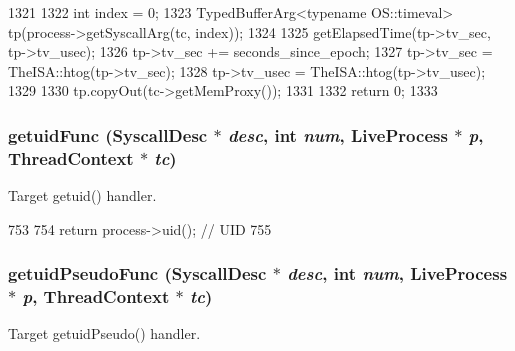 \begin{DoxyCode}
1321 {
1322     int index = 0;
1323     TypedBufferArg<typename OS::timeval> tp(process->getSyscallArg(tc, index));
1324 
1325     getElapsedTime(tp->tv_sec, tp->tv_usec);
1326     tp->tv_sec += seconds_since_epoch;
1327     tp->tv_sec = TheISA::htog(tp->tv_sec);
1328     tp->tv_usec = TheISA::htog(tp->tv_usec);
1329 
1330     tp.copyOut(tc->getMemProxy());
1331 
1332     return 0;
1333 }
\end{DoxyCode}
\hypertarget{syscall__emul_8hh_a383f24dfb168d66c98717246b91e01f5}{
\subsubsection[{getuidFunc}]{ getuidFunc ({\bf SyscallDesc} $\ast$ {\em desc}, \/  int {\em num}, \/  {\bf LiveProcess} $\ast$ {\em p}, \/  {\bf ThreadContext} $\ast$ {\em tc})}}
\label{syscall__emul_8hh_a383f24dfb168d66c98717246b91e01f5}


Target getuid() handler. 


\begin{DoxyCode}
753 {
754     return process->uid();              // UID
755 }
\end{DoxyCode}
\hypertarget{syscall__emul_8hh_a4a4bc3599400554b3e122765ffaa17db}{
\subsubsection[{getuidPseudoFunc}]{ getuidPseudoFunc ({\bf SyscallDesc} $\ast$ {\em desc}, \/  int {\em num}, \/  {\bf LiveProcess} $\ast$ {\em p}, \/  {\bf ThreadContext} $\ast$ {\em tc})}}
\label{syscall__emul_8hh_a4a4bc3599400554b3e122765ffaa17db}


Target getuidPseudo() handler. 


